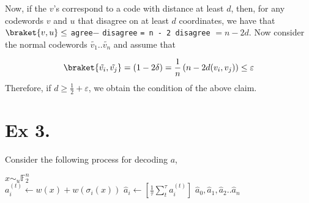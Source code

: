 \documentclass{article}
\newcommand{\FF}{\mathbb{F}}
\begin{document}
Now, if the $v$'s correspond to a code with distance at least $d$, then, for any codewords $v$ and $u$ that disagree on at least $d$ coordinates, we have that $\braket{v,u} \le$ \verb|agree|$-$ \verb|disagree| \verb|= n - 2 disagree| $=n -2d$. Now consider the normal codewords $\tilde{v_{1}} .. \tilde{v_{n}}$ and assume that 

\begin{equation*}
  \begin{split}
    \braket{ \tilde{v_{i}},\tilde{v_{j}}} = \left(1 - 2\delta \right)= \frac{1}{n}\left( n -2 d(v_{i},v_{j}) \right) \le  \varepsilon
  \end{split}
\end{equation*}
Therefore, if $d \ge \frac{1}{2} + \varepsilon$, we obtain the condition of the above claim.

\section{Ex 3.}
Consider the following process for decoding $a$,


\begin{algorithm}[H]
    {
     {
      $x \sim_{u} \FF_{2}^{n}$ \\
      $a_{i}^{(t)} \leftarrow w\left( x \right) + w\left( \sigma_{i}(x) \right)$
    }
}
 {
  $\hat{a}_{i} \leftarrow [ \frac{1}{\tau}\sum_{t}^{\tau}{ a_{i}^{(t)}  }  ]$ 
}
\Return $ \hat{a}_{0}, \hat{a}_{1}, \hat{a}_{2} .. \hat{a}_{n} $
\end{algorithm}
\end{document}
